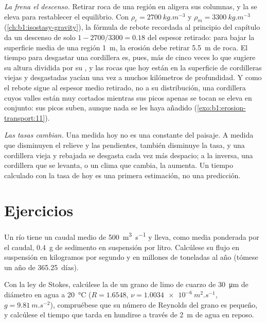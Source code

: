 \emph{La  frena el descenso.} Retirar roca de una región en  aligera sus columnas, y la  se eleva para restablecer el equilibrio. Con $\rho_c
= \qty{2700}{kg.m^{-3}}$ y $\rho_m = \qty{3300}{kg.m^{-3}}$
(\cref{ch:b1:isostasy-gravity}), la fórmula de rebote recordada al principio del
capítulo da un descenso de solo $1 - 2700/3300 = 0.18$ del espesor retirado: para bajar la superficie media de una región \qty{1}{m}, la erosión debe retirar
\qty{5.5}{m} de roca. El tiempo para desgastar una cordillera es, pues, más de cinco veces lo que sugiere su altura dividida por su , y las rocas
que hoy están en la superficie de cordilleras viejas y desgastadas yacían una vez a muchos kilómetros de profundidad. Y como el rebote sigue al espesor medio retirado,
no a su distribución, una cordillera cuyos valles están muy cortados mientras sus picos apenas se tocan se eleva en conjunto: sus picos suben, aunque nada se les haya
añadido (\cref{exo:b1:erosion-transport:11}).

\emph{Las tasas cambian.} Una  medida hoy no es una constante del paisaje. A medida que disminuyen el relieve y las pendientes, también disminuye la tasa,
y una cordillera vieja y rebajada se desgasta cada vez más despacio; a la inversa, una cordillera que se levanta, o un clima que cambia, la aumenta. Un tiempo calculado
con la tasa de hoy es una primera estimación, no una predicción.

\section{Ejercicios}

\begin{exercise}[$\star$]\label{exo:b1:erosion-transport:1}
Un río tiene un caudal medio de \qty{500}{m^3.s^{-1}} y lleva, como media ponderada por el caudal, \qty{0.4}{g} de sedimento en suspensión por litro. Calcúlese su
flujo en suspensión en kilogramos por segundo y en millones de toneladas al año (tómese un año de \num{365.25}~días).
\end{exercise}

\begin{exercise}[$\star$]\label{exo:b1:erosion-transport:2}
Con la ley de Stokes, calcúlese la  de un grano de limo de cuarzo de \qty{30}{\micro m} de diámetro en agua a \qty{20}{\celsius}
($R = 1.6548$, $\nu =
\qty{1.0034e-6}{m^2.s^{-1}}$, $g = \qty{9.81}{m.s^{-2}}$), compruébese que su
número de Reynolds del grano es pequeño, y calcúlese el tiempo que tarda en hundirse a través de \qty{2}{m} de agua en reposo.
\end{exercise}

